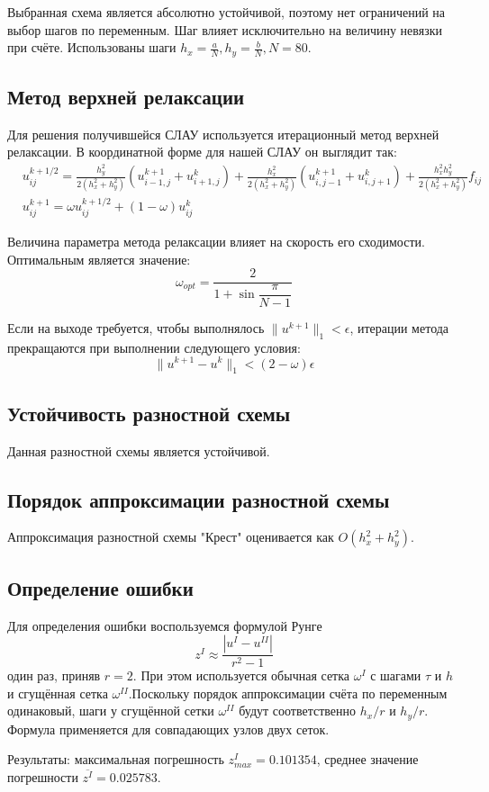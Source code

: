 \documentclass[titlepage,12pt]{article}
\begin{document}
Выбранная схема является абсолютно устойчивой, поэтому нет ограничений на выбор шагов по переменным. Шаг влияет исключительно на величину невязки при счёте. Использованы шаги $h_x = \frac{a}{N}, h_y = \frac{b}{N} , N = 80$.

\subsection{Метод верхней релаксации}
Для решения получившейся СЛАУ используется итерационный метод верхней релаксации. В координатной форме для нашей СЛАУ он выглядит так:
\begin{align*}
&u_{ij}^{k+1/2} = \frac{h_y^2}{2(h_x^2 + h_y^2)}(u_{i-1,j}^{k+1} + u_{i+1,j}^k) + 
	  							\frac{h_x^2}{2(h_x^2 + h_y^2)}(u_{i,j-1}^{k+1} + u_{i,j+1}^k) +
								  \frac{h_x^2 h_y^2}{2(h_x^2 + h_y^2)} f_{ij} \\
&u_{ij}^{k+1} = \omega u_{ij}^{k+1/2} + (1-\omega)u_{ij}^k
\end{align*}

Величина параметра метода релаксации влияет на скорость его сходимости. Оптимальным является значение:
$$
\omega_{opt} = \frac{2}{1+\sin\dfrac{\pi}{N-1}}
$$

Если на выходе требуется, чтобы выполнялось $\|u^{k+1}\|_1 < \epsilon$, итерации метода прекращаются при выполнении следующего условия:
$$
\|u^{k+1} - u^k\|_1 < (2-\omega)\epsilon
$$

\subsection{Устойчивость разностной схемы}
Данная разностной схемы является устойчивой. 

\subsection{Порядок аппроксимации разностной схемы}
Аппроксимация разностной схемы "Крест" оценивается как $O(h_x^2 + h_y^2)$. 

\subsection{Определение ошибки}
Для определения ошибки воспользуемся формулой Рунге 
$$
z^I \approx \frac{|u^I - u^{II}|}{r^2-1}
$$
один раз, приняв $r=2$. При этом используется обычная сетка $\omega^I$ с шагами $\tau$ и $h$ и сгущённая сетка $\omega^{II}$.Поскольку порядок аппроксимации счёта по переменным одинаковый, шаги у сгущённой сетки $\omega^{II}$ будут соответственно $h_x / r$ и $h_y / r$. Формула применяется для совпадающих узлов двух сеток.\par
Результаты: максимальная погрешность  $z^I_{max} = 0.101354$, среднее значение погрешности $\overline{z^I} = 0.025783$.
\end{document}
